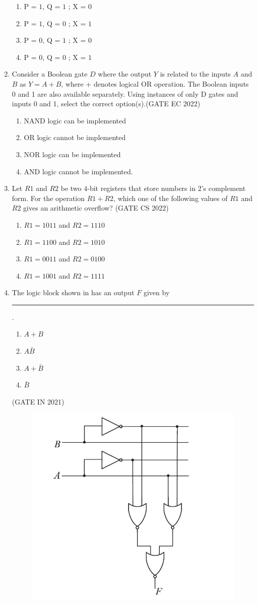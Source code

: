 \begin{enumerate}[label=\arabic*.,ref=\theenumi]
		\begin{enumerate}[label=(\Alph*)]
		\item P = $1$, Q = $1$ ; X = $0$
		\item P = $1$, Q = $0$ ; X = $1$
		\item P = $0$, Q = $1$ ; X = $0$
		\item P = $0$, Q = $0$ ; X = $1$
	\end{enumerate}
\item 
Consider a Boolean gate $D$ where the output $Y$ is related to the inputs $A$ and $B$ as $Y = A + B$, where + denotes logical OR operation. The Boolean inputs 0 and 1 are also available separately. Using instances of only D gates and inputs 0 and 1, select the correct option(s).\hfill{(GATE EC 2022)}
\begin{enumerate}
\item  NAND logic can be implemented
\item  OR logic cannot be implemented
\item  NOR logic can be implemented
\item  AND logic cannot be implemented.
\end{enumerate}
%
\item Let $R1$ and $R2$ be two $4$-bit registers that store numbers in $2$’s complement form.
For the operation $R1+R2$, which one of the following values of $R1$ and $R2$ gives an
arithmetic overflow?
\hfill{(GATE CS 2022)}
%
    \begin{enumerate}
        \item $R1 = 1011$ and $R2 = 1110$
        \item $R1 = 1100$ and $R2 = 1010$
        \item $R1 = 0011$ and $R2 = 0100$
        \item $R1 = 1001$ and $R2 = 1111$
    \end{enumerate}
\item The logic block shown 
in
	has an output $F$ given by \rule{1cm}{0.5pt}.
\begin{enumerate}
	\item$A+B$
	\item$A\bar{B}$
	\item$A+\bar{B}$
	\item$\bar{B}$
\end{enumerate}
\hfill (GATE IN 2021)
\begin{figure}[H]
\centering
\includegraphics[width=0.5\columnwidth]{figs/gatemage.jpg}

\end{figure}
\end{enumerate}
